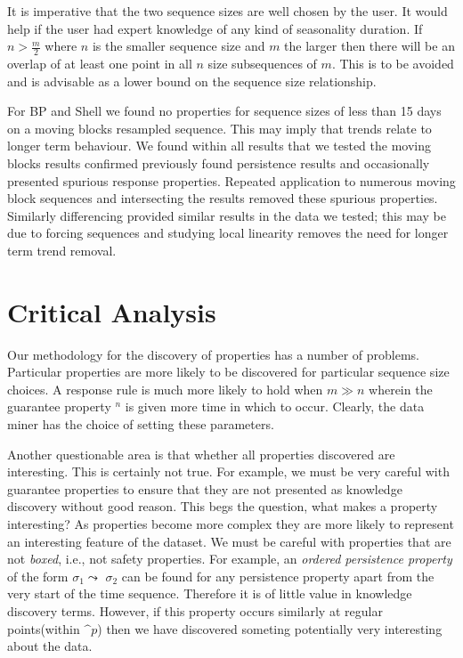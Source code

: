 It is imperative that the two sequence sizes are well chosen by the
user. It would help if the user had expert knowledge of any kind of
seasonality duration. If $n > \frac{m}{2}$ where $n$ is the
smaller sequence size and $m$ the larger then there will be an overlap
of at least one point in all $n$ size subsequences of $m$. This is to
be avoided and is advisable as a lower bound on the sequence size
relationship. 

\medskip

 For BP and Shell we found no properties for sequence
sizes of less than 15 days on a moving blocks resampled sequence. This
may imply that trends relate to longer term behaviour.
We
found within all results that we tested the moving blocks results
confirmed previously found persistence results and occasionally
presented spurious response properties. Repeated application to
numerous moving block sequences and intersecting the results removed
these spurious properties. Similarly differencing provided similar
results in the data we tested; this may be due to forcing sequences
and studying local linearity removes the need for longer term trend
removal.


\section{Critical Analysis}\label{sec:tr_crit_an}

Our methodology for the discovery of properties has a number of
problems. Particular properties are more likely to be discovered for
particular sequence size choices. A response rule  is much
more likely to hold when $m \gg n$ wherein the guarantee property
\diam$^n$ is given more time in which to occur. Clearly, the data
miner has the choice of setting these parameters.

\medskip

Another questionable area is that whether all properties discovered
are interesting. This is certainly not true. For example, we must be
very careful with guarantee properties to ensure that they are not
presented as knowledge discovery without good reason. This begs the
question, what makes a property interesting? As properties become more
complex they are more likely to represent an interesting feature of
the dataset. We must be careful with properties that are not {\em
boxed}, i.e., not safety properties. For example, an {\em ordered
persistence property} of the form $\sigma_1 \leadsto$  $\sigma_2$
can be found for any persistence property apart from the very start of
the time sequence. Therefore it is of little value in knowledge
discovery terms. However, if this property occurs similarly at regular
points(within $\bm^{p}$) then we have discovered someting potentially
very interesting about the data.

